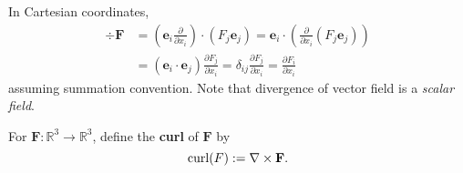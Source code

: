 \begin{note}
    In Cartesian coordinates, 
    \begin{align*}
        \div \mathbf{F} &= \left( \mathbf{e}_i \frac{\partial }{\partial x_i} \right)\cdot (F_j\mathbf{e}_j) = \mathbf{e}_i \cdot \left( \frac{\partial }{\partial x_i}(F_j\mathbf{e}_j)  \right)\\ 
        &= (\mathbf{e}_i \cdot \mathbf{e}_j)\frac{\partial F_j}{\partial x_i} = \delta_{ij}\frac{\partial F_j}{\partial x_i} = \boxed{\frac{\partial F_i}{\partial x_i} } 
    \end{align*}
    assuming summation convention. Note that divergence of vector field is a \textit{scalar field}.
\end{note}

\begin{definition}[Curl]
    For $ \mathbf{F}:\mathbb{R}^{3}\to \mathbb{R}^{3} $, define the \textbf{curl} of $\mathbf{F}$ by 
    \[
        \operatorname{curl}(F):= \nabla\times \mathbf{F}.
    \]
\end{definition}


